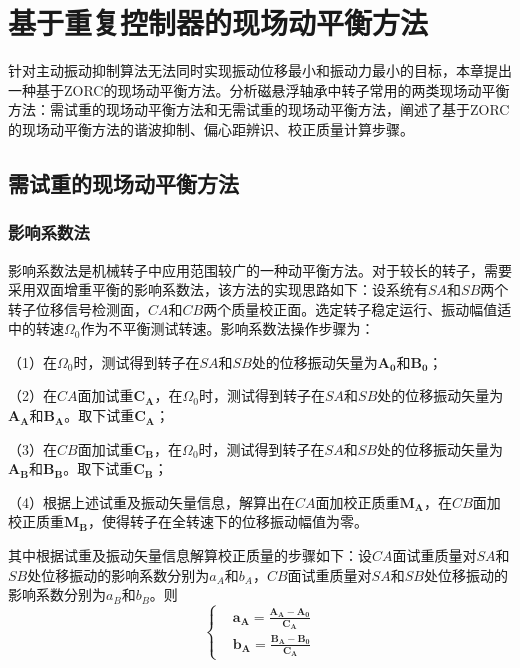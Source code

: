 \documentclass[
  lang=cn,
  degree=master,
  openany,oneside
]{nuaathesis}
\begin{document}
\chapter{基于重复控制器的现场动平衡方法}
针对主动振动抑制算法无法同时实现振动位移最小和振动力最小的目标，本章提出一种基于ZORC的现场动平衡方法。分析磁悬浮轴承中转子常用的两类现场动平衡方法：需试重的现场动平衡方法和无需试重的现场动平衡方法，阐述了基于ZORC的现场动平衡方法的谐波抑制、偏心距辨识、校正质量计算步骤。

\section{需试重的现场动平衡方法}

\subsection{影响系数法}

影响系数法是机械转子中应用范围较广的一种动平衡方法。对于较长的转子，需要采用双面增重平衡的影响系数法，该方法的实现思路如下：设系统有$SA$和$SB$两个转子位移信号检测面，$CA$和$CB$两个质量校正面。选定转子稳定运行、振动幅值适中的转速$\Omega _0$作为不平衡测试转速。影响系数法操作步骤为：

（1）在$\Omega _0$时，测试得到转子在$SA$和$SB$处的位移振动矢量为${\boldsymbol{A_0}}$和${\boldsymbol{B_0}}$；

（2）在$CA$面加试重${\boldsymbol{C_A}}$，在$\Omega _0$时，测试得到转子在$SA$和$SB$处的位移振动矢量为${\boldsymbol{A_A}}$和${\boldsymbol{B_A}}$。取下试重${\boldsymbol{C_A}}$；

（3）在$CB$面加试重${\boldsymbol{C_B}}$，在$\Omega _0$时，测试得到转子在$SA$和$SB$处的位移振动矢量为${\boldsymbol{A_B}}$和${\boldsymbol{B_B}}$。取下试重${\boldsymbol{C_B}}$；

（4）根据上述试重及振动矢量信息，解算出在$CA$面加校正质重${\boldsymbol{M_A}}$，在$CB$面加校正质重${\boldsymbol{M_B}}$，使得转子在全转速下的位移振动幅值为零。

其中根据试重及振动矢量信息解算校正质量的步骤如下：设$CA$面试重质量对$SA$和$SB$处位移振动的影响系数分别为$a_A$和$b_A$，$CB$面试重质量对$SA$和$SB$处位移振动的影响系数分别为$a_B$和$b_B$。则
\begin{equation}
\left\{
\begin{aligned}
&	{\boldsymbol{a_A}} = \frac{{\boldsymbol{A_A}}-{\boldsymbol{A_0}}}{{\boldsymbol{C_A}}} \\
&		{\boldsymbol{b_A}} = \frac{{\boldsymbol{B_A}}-{\boldsymbol{B_0}}}{{\boldsymbol{C_A}}}
\end{aligned}
\right.
\end{equation}
\end{document}
